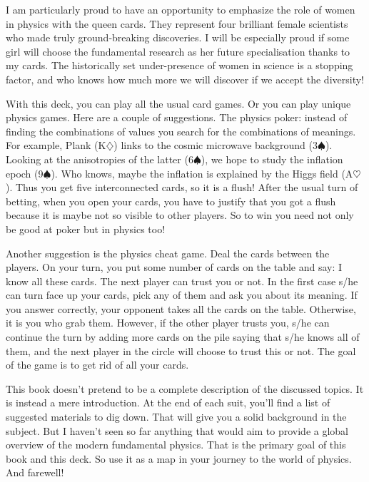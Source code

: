 \documentclass[]{bookest}
\begin{document}
I am particularly proud to have an opportunity to emphasize the role of women in physics with the queen cards. They represent four brilliant female scientists who made truly ground-breaking discoveries. I will be especially proud if some girl will choose the fundamental research as her future specialisation thanks to my cards. The historically set under-presence of women in science is a stopping factor, and who knows how much more we will discover if we accept the diversity!

With this deck, you can play all the usual card games. Or you can play unique physics games. Here are a couple of suggestions. The physics poker: instead of finding the combinations of values you search for the combinations of meanings. For example, Plank (K$\diamondsuit$) links to the cosmic microwave background (3$\spadesuit$). Looking at the anisotropies of the latter (6$\spadesuit$), we hope to study the inflation epoch (9$\spadesuit$). Who knows, maybe the inflation is explained by the Higgs field (A$\heartsuit$). Thus you get five interconnected cards, so it is a flush! After the usual turn of betting, when you open your cards, you have to justify that you got a flush because it is maybe not so visible to other players. So to win you need not only be good at poker but in physics too!

Another suggestion is the physics cheat game. Deal the cards between the players. On your turn, you put some number of cards on the table and say: I know all these cards. The next player can trust you or not. In the first case s/he can turn face up your cards, pick any of them and ask you about its meaning. If you answer correctly, your opponent takes all the cards on the table. Otherwise, it is you who grab them. However, if the other player trusts you, s/he can continue the turn by adding more cards on the pile saying that s/he knows all of them, and the next player in the circle will choose to trust this or not. The goal of the game is to get rid of all your cards.

This book doesn't pretend to be a complete description of the discussed topics. It is instead a mere introduction. At the end of each suit, you'll find a list of suggested materials to dig down. That will give you a solid background in the subject. But I haven't seen so far anything that would aim to provide a global overview of the modern fundamental physics. That is the primary goal of this book and this deck. So use it as a map in your journey to the world of physics. And farewell!

\newpage





\end{document}
